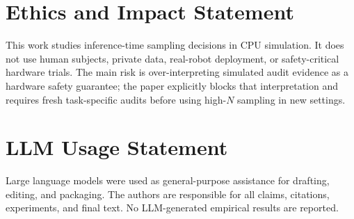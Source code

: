 \documentclass{article}
\begin{document}
\section*{Ethics and Impact Statement}
This work studies inference-time sampling decisions in CPU simulation. It does not use human subjects, private data, real-robot deployment, or safety-critical hardware trials. The main risk is over-interpreting simulated audit evidence as a hardware safety guarantee; the paper explicitly blocks that interpretation and requires fresh task-specific audits before using high-$N$ sampling in new settings.

\section*{LLM Usage Statement}
Large language models were used as general-purpose assistance for drafting, editing, and packaging. The authors are responsible for all claims, citations, experiments, and final text. No LLM-generated empirical results are reported.

\label{maintextend}



\appendix

\end{document}
